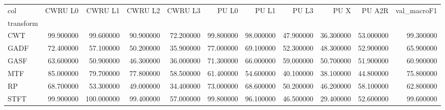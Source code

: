 \begin{tabular}{lrrrrrrrrrr}
\toprule
col & CWRU L0 & CWRU L1 & CWRU L2 & CWRU L3 & PU L0 & PU L1 & PU L3 & PU X & PU A2R & val\_macroF1 \\
transform &  &  &  &  &  &  &  &  &  &  \\
\midrule
CWT & 99.900000 & 99.600000 & 90.900000 & 72.200000 & 99.800000 & 98.000000 & 47.900000 & 36.300000 & 53.000000 & 99.300000 \\
GADF & 72.400000 & 57.100000 & 50.200000 & 35.900000 & 77.000000 & 69.100000 & 52.300000 & 48.300000 & 52.900000 & 65.900000 \\
GASF & 63.600000 & 50.900000 & 46.300000 & 36.000000 & 71.300000 & 66.000000 & 59.000000 & 50.700000 & 51.900000 & 60.900000 \\
MTF & 85.000000 & 79.700000 & 77.800000 & 58.500000 & 61.400000 & 54.600000 & 40.100000 & 38.100000 & 44.800000 & 75.800000 \\
RP & 68.700000 & 53.300000 & 49.000000 & 34.400000 & 73.000000 & 68.600000 & 50.200000 & 46.200000 & 58.100000 & 62.800000 \\
STFT & 99.900000 & 100.000000 & 99.400000 & 57.000000 & 99.800000 & 96.100000 & 46.500000 & 29.400000 & 52.600000 & 99.600000 \\
\bottomrule
\end{tabular}
